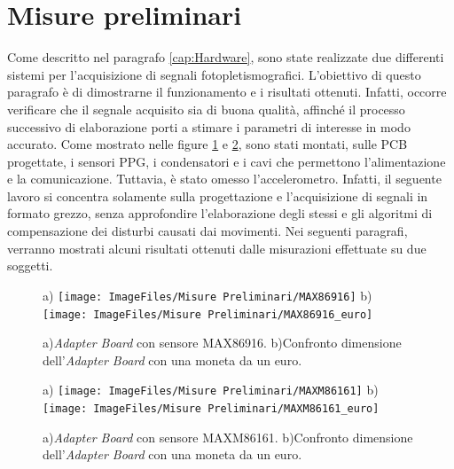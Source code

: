 \clearpage

\section{Misure preliminari}

Come descritto nel paragrafo \ref{cap:Hardware}, sono state realizzate due differenti sistemi per l'acquisizione di segnali fotopletismografici. L'obiettivo di questo paragrafo è di dimostrarne il funzionamento e i risultati ottenuti. Infatti, occorre verificare che il segnale acquisito sia di buona qualità, affinché il processo successivo di elaborazione porti a stimare i parametri di interesse in modo accurato. Come mostrato nelle figure \ref{fig:foto_moduli_MAX86916} e \ref{fig:foto_moduli_MAXM86161}, sono stati montati, sulle PCB progettate, i sensori PPG, i condensatori e i cavi che permettono l'alimentazione e la comunicazione. Tuttavia, è stato omesso l'accelerometro. Infatti, il seguente lavoro si concentra solamente sulla progettazione e l'acquisizione di segnali in formato grezzo, senza approfondire l'elaborazione degli stessi e gli algoritmi di compensazione dei disturbi causati dai movimenti. Nei seguenti paragrafi, verranno mostrati alcuni risultati ottenuti dalle misurazioni effettuate su due soggetti.

\begin{figure}[bh]
	\centering
	a)
	\texttt{[image: ImageFiles/Misure Preliminari/MAX86916]}
	b)
	\texttt{[image: ImageFiles/Misure Preliminari/MAX86916\_euro]}
	\caption{a)\textit{Adapter Board} con sensore MAX86916. b)Confronto dimensione dell'\textit{Adapter Board} con una moneta da un euro.}
	\label{fig:foto_moduli_MAX86916}
\end{figure}

\begin{figure}[bh]
	\centering
	a)
	\texttt{[image: ImageFiles/Misure Preliminari/MAXM86161]}
	b)
	\texttt{[image: ImageFiles/Misure Preliminari/MAXM86161\_euro]}
	\caption{a)\textit{Adapter Board} con sensore MAXM86161. b)Confronto dimensione dell'\textit{Adapter Board} con una moneta da un euro.}
	\label{fig:foto_moduli_MAXM86161}
\end{figure}

